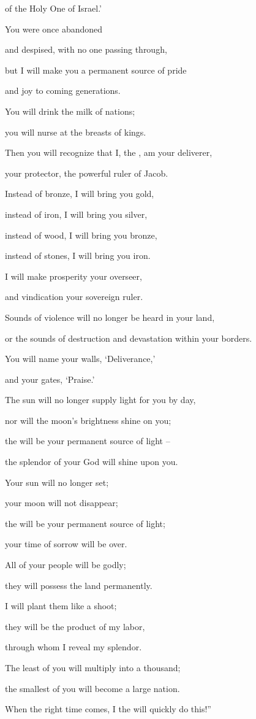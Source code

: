 {of the Holy One
of Israel.’
\par }{\Q {}You were once
abandoned
\par }{\Q and despised,
with no
one passing
through,
\par }{\Q but I will make
you a permanent
source of
pride
\par }{\Q and joy
to coming
generations.
\par }{\Q {}You will drink
the milk
of nations;
\par }{\Q you will nurse
at the breasts
of kings.
\par }{\Q Then you will recognize
that
I,
the {}, am your deliverer,
\par }{\Q your protector,
the powerful ruler
of Jacob.
\par }{\Q {}Instead
of bronze,
I will bring
you gold,
\par }{\Q instead
of iron,
I will bring
you silver,
\par }{\Q instead
of wood,
I will bring you bronze,
\par }{\Q instead
of stones,
I
will bring
you iron.
\par }{\Q I
will make
prosperity
your overseer,
\par }{\Q and vindication
your sovereign ruler.
\par }{\Q {}Sounds of violence
will no
longer
be heard
in your land,
\par }{\Q or the sounds of destruction
and devastation
within your borders.
\par }{\Q You will name
your walls,
‘Deliverance,’
\par }{\Q and your gates,
‘Praise.’
\par }{\Q {}The sun
will no
longer
supply light
for you by day,
\par }{\Q nor
will the moon’s
brightness
shine
on you;
\par }{\Q the {}
will be your permanent
source of light
–
\par }{\Q the splendor
of your God will shine upon you.
\par }{\Q {}Your sun
will no
longer
set;
\par }{\Q your moon
will not
disappear;
\par }{\Q the {}
will be
your permanent
source
of light;
\par }{\Q your time
of sorrow will be over.
\par }{\Q {}All
of your people
will be godly;
\par }{\Q they will possess
the land
permanently.
\par }{\Q I will plant
them like a shoot;
\par }{\Q they will be the product
of my labor,
\par }{\Q through
whom I reveal my splendor.
\par }{\Q {}The least
of you will multiply into a thousand;
\par }{\Q the smallest
of you will become
a large
nation.
\par }{\Q When the right time
comes, I
the {}
will quickly do this!”

}
